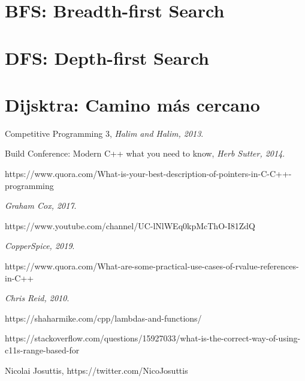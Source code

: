 \documentclass[12pt, fleqn]{report}                             %
\theoremstyle{break}                                            %
\begin{document}
        \section{BFS: Breadth-first Search}


        \section{DFS: Depth-first Search}

        \section{Dijsktra: Camino más cercano}



\begin{thebibliography}{10}

        Competitive Programming 3,
        \textit{Halim and Halim, 2013}. 


        Build Conference: Modern C++ what you need to know,
        \textit{Herb Sutter, 2014}. 

        https://www.quora.com/What-is-your-best-description-of-pointers-in-C-C++-programming

        \textit{Graham Cox, 2017}. 

        https://www.youtube.com/channel/UC-lNlWEq0kpMcThO-I81ZdQ

        \textit{CopperSpice, 2019}. 

        https://www.quora.com/What-are-some-practical-use-cases-of-rvalue-references-in-C++

        \textit{Chris Reid, 2010}. 

        https://shaharmike.com/cpp/lambdas-and-functions/

        https://stackoverflow.com/questions/15927033/what-is-the-correct-way-of-using-c11s-range-based-for

        Nicolai Josuttis, https://twitter.com/NicoJosuttis


\end{thebibliography}
\end{document}
